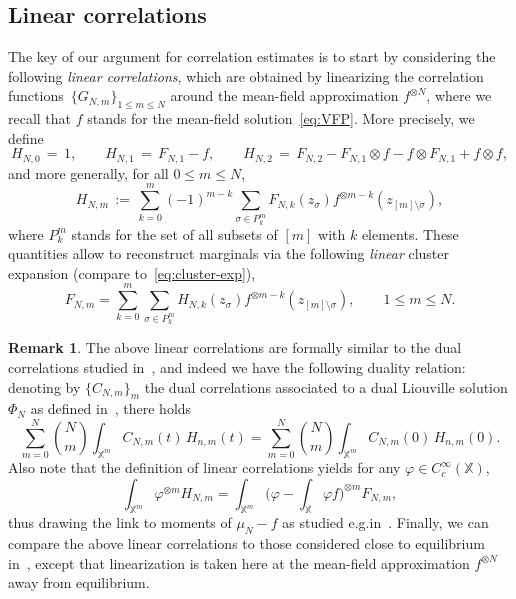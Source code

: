 \documentclass[a4paper,11pt,reqno,noindent]{amsart}
\theoremstyle{plain}
\theoremstyle{definition}
\newtheorem{rem}[theor]{Remark}
\numberwithin{equation}{section}
\newcommand{\Xd}{\mathbb X}
\begin{document}
\subsection{Linear correlations}
The key of our argument for correlation estimates is to start by considering the following {\it linear correlations}, which are obtained by linearizing the correlation functions~$\{G_{N,m}\}_{1\le m\le N}$ around the mean-field approximation $f^{\otimes N}$, where we recall that $f$ stands for the mean-field solution~\eqref{eq:VFP}. More precisely, we define
\begin{equation*}
H_{N,0}\,=\,1,\qquad
H_{N,1}\,=\,F_{N,1}-f,\qquad
H_{N,2}\,=\,F_{N,2}-F_{N,1}\otimes f-f\otimes F_{N,1}+f\otimes f,
\end{equation*}
and more generally, for all $0\le m\le N$,
\begin{equation}\label{eq:defin-HNm}
H_{N,m}\,:=\,\sum_{k=0}^m(-1)^{m-k}\sum_{\sigma\in P^m_k}F_{N,k}(z_\sigma)f^{\otimes m-k}(z_{[m]\setminus\sigma}),
\end{equation}
where $P^m_k$ stands for the set of all subsets of $[m]$ with $k$ elements.
These quantities allow to reconstruct marginals via the following {\it linear} cluster expansion (compare to~\eqref{eq:cluster-exp}),
\begin{equation}\label{eq:cluster-FNmlin}
F_{N,m}=\sum_{k=0}^m\sum_{\sigma\in P^m_k}H_{N,k}(z_\sigma)f^{\otimes m-k}(z_{[m]\setminus\sigma}),\qquad1\le m\le N.
\end{equation}

\begin{rem}
The above linear correlations are formally similar to the dual correlations studied in~\cite{BDJ-24}, and indeed we have the following duality relation: denoting by $\{C_{N,m}\}_m$ the dual correlations associated to a dual Liouville solution $\Phi_N$ as defined in~\cite[Section~2]{BDJ-24}, there holds
\[
\sum_{m=0}^N \binom{N}{m}\int_{\Xd^m} C_{N,m}(t)\,H_{n,m}(t)=\sum_{m=0}^N \binom{N}{m}\int_{\Xd^m} C_{N,m}(0)\,H_{n,m}(0).
\]
Also note that the definition of linear correlations yields for any $\varphi\in C^\infty_c(\Xd)$,
\[\int_{\Xd^m}\varphi^{\otimes m}H_{N,m}=\int_{\Xd^m}\Big(\varphi-\int_{\Xd}\varphi f\Big)^{\otimes m}F_{N,m},\]
thus drawing the link to moments of $\mu_N-f$ as studied e.g.\@ in~\cite{BDM_25}.
Finally, we can compare the above linear correlations to those considered close to equilibrium in~\cite{BGS-17,DSR-21,DJ-24}, except that linearization is taken here at the mean-field approximation $f^{\otimes N}$ away from equilibrium.
\end{rem}
\end{document}
